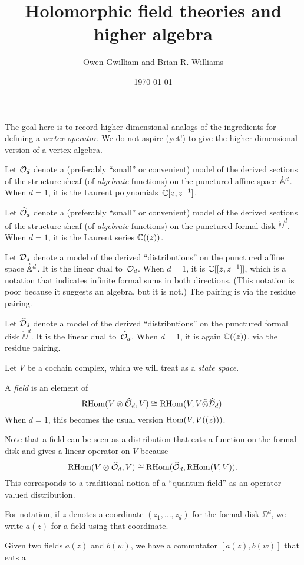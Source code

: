 \documentclass[11pt]{amsart}
\author{Owen Gwilliam and Brian R. Williams}
\date{\today}
\title{Holomorphic field theories and higher algebra}
\def\RHom{{\rm RHom}}
\begin{document}
The goal here is to record higher-dimensional analogs of the ingredients for defining a {\em vertex operator}. We do not aspire (yet!) to give the higher-dimensional version of a vertex algebra.

Let $\cO_d$ denote a (preferably ``small'' or convenient) model of the derived sections of the structure sheaf (of {\em algebraic} functions) on the punctured affine space $\mathring{\AA}^d$.
When $d=1$, it is the Laurent polynomials~$\CC[z,z^{-1}]$.

Let $\widehat{\cO}_d$ denote a (preferably ``small'' or convenient) model of the derived sections of the structure sheaf (of {\em algebraic} functions) on the punctured formal disk $\mathring{\DD}^d$.
When $d=1$, it is the Laurent series $\CC((z))$.

Let $\cD_d$ denote a model of the derived ``distributions'' on the punctured affine space $\mathring{\AA}^d$. It is the linear dual to~$\cO_d$.
When $d=1$, it is $\CC[[z,z^{-1}]]$, which is a notation that indicates infinite formal sums in both directions. (This notation is poor because it suggests an algebra, but it is not.)
The pairing is via the residue pairing.

Let $\widehat{\cD}_d$ denote a model of the derived ``distributions'' on the punctured formal disk $\mathring{\DD}^d$. It is the linear dual to~$\widehat{\cO}_d$.
When $d=1$, it is again $\CC((z))$, via the residue pairing.

Let $V$ be a cochain complex, which we will treat as a {\em state space}.

A {\em field} is an element of 
\[
\RHom(V \otimes \widehat{\cO}_d, V) \cong \RHom(V, V \widehat{\otimes} \widehat{\cD}_d).
\]
When $d=1$, this becomes the usual version $\Hom(V, V((z)))$.

Note that a field can be seen as a distribution that eats a function on the formal disk and gives a linear operator on $V$ because
\[
\RHom(V \otimes \widehat{\cO}_d, V) \cong \RHom(\widehat{\cO}_d, \RHom(V,V)).
\]
This corresponds to a traditional notion of a ``quantum field'' as an operator-valued distribution.

For notation, if $z$ denotes a coordinate $(z_1,\ldots,z_d)$ for the formal disk $\DD^d$,
we write $a(z)$ for a field using that coordinate.

Given two fields $a(z)$ and $b(w)$, we have a commutator $[a(z),b(w)]$ that eats a 
 
\end{document}
